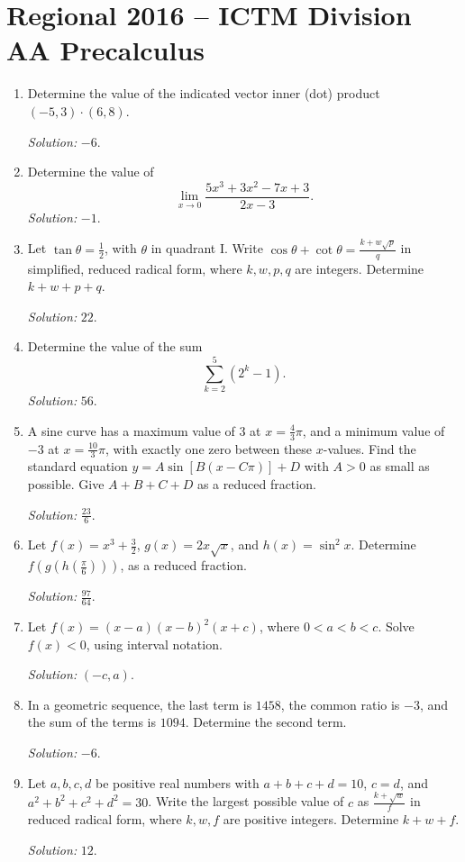 \documentclass[11pt]{article}
\begin{document}
\section*{Regional 2016 -- ICTM Division AA Precalculus}
\begin{enumerate}[label=\textbf{\arabic*.}]
\item Determine the value of the indicated vector inner (dot) product $(-5,3)\cdot(6,8)$.\par\textit{Solution: }$-6$.

\item Determine the value of
\[
\lim_{x\to0}\frac{5x^3+3x^2-7x+3}{2x-3}.
\]
\textit{Solution: }$-1$.

\item Let $\tan\theta=\frac12$, with $\theta$ in quadrant I. Write $\cos\theta+\cot\theta=\frac{k+w\sqrt{p}}{q}$ in simplified, reduced radical form, where $k,w,p,q$ are integers. Determine $k+w+p+q$.\par\textit{Solution: }$22$.

\item Determine the value of the sum
\[
\sum_{k=2}^{5}(2^k-1).
\]
\textit{Solution: }$56$.

\item A sine curve has a maximum value of $3$ at $x=\frac43\pi$, and a minimum value of $-3$ at $x=\frac{10}{3}\pi$, with exactly one zero between these $x$-values. Find the standard equation $y=A\sin[B(x-C\pi)]+D$ with $A>0$ as small as possible. Give $A+B+C+D$ as a reduced fraction.\par\textit{Solution: }$\frac{23}{6}$.

\item Let $f(x)=x^3+\frac32$, $g(x)=2x\sqrt{x}$, and $h(x)=\sin^2x$. Determine $f(g(h(\frac{\pi}{6})))$, as a reduced fraction.\par\textit{Solution: }$\frac{97}{64}$.

\item Let $f(x)=(x-a)(x-b)^2(x+c)$, where $0<a<b<c$. Solve $f(x)<0$, using interval notation.\par\textit{Solution: }$(-c,a)$.

\item In a geometric sequence, the last term is $1458$, the common ratio is $-3$, and the sum of the terms is $1094$. Determine the second term.\par\textit{Solution: }$-6$.

\item Let $a,b,c,d$ be positive real numbers with $a+b+c+d=10$, $c=d$, and $a^2+b^2+c^2+d^2=30$. Write the largest possible value of $c$ as $\frac{k+\sqrt w}{f}$ in reduced radical form, where $k,w,f$ are positive integers. Determine $k+w+f$.\par\textit{Solution: }$12$.


\end{enumerate}
\end{document}
